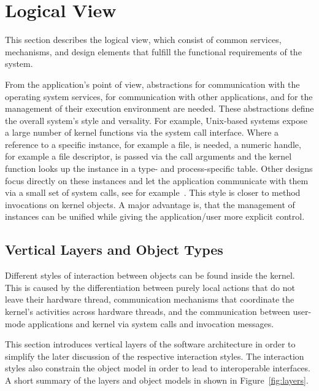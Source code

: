 \section{Logical View}
\label{sec:global-logical-view}

This section describes the logical view, which consist of common services, mechanisms, and design elements that fulfill the functional requirements of the system.

From the application's point of view, abstractions for communication with the operating system services, for communication with other applications, and for the management of their execution environment are needed. These abstractions define the overall system's style and versality.
For example, Unix-based systems expose a large number of kernel functions via the system call interface. Where a reference to a specific instance, for example a file, is needed, a numeric handle, for example a file descriptor, is passed via the call arguments and the kernel function looks up the instance in a type- and process-specific table.
Other designs focus directly on these instances and let the application communicate with them via a small set of system calls, see for example~\cite{Liedtke1996}. This style is closer to method invocations on kernel objects. A major advantage is, that the management of instances can be unified while giving the application/user more explicit control.

\subsection{Vertical Layers and Object Types}
\label{sec:vert-layer}
Different styles of interaction between objects can be found inside the kernel. This is caused by the differentiation between purely local actions that do not leave their hardware thread, communication mechanisms that coordinate the kernel's activities across hardware threads, and the communication between user-mode applications and kernel via system calls and invocation messages.

This section introduces vertical layers of the software architecture in order to simplify the later discussion of the respective interaction styles. The interaction styles also constrain the object model in order to lead to interoperable interfaces. A short summary of the layers and object models in shown in Figure~\ref{fig:layers}.

